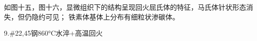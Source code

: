 \documentclass[a4paper,utf8]{article}
\begin{document}
如图十五，图十六，显微组织下的结构呈现回火屈氏体的特征，马氏体针状形态消失，但仍隐约可见；
铁素体基体上分布有细粒状渗碳体。
\begin{figure}[!ht]
    \begin{floatrow}
            
    \end{floatrow}

\end{figure}

9.\#22,45钢860°C水淬+高温回火
\end{document}
